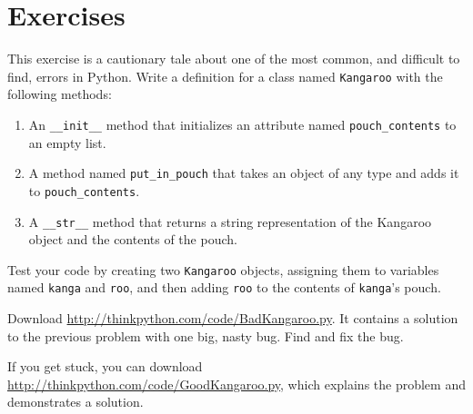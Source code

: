 \documentclass[10pt]{book}
\begin{document}
\section{Exercises}

\begin{exercise}

This exercise is a cautionary tale about one of the most
common, and difficult to find, errors in Python.
Write a definition for a class named {\tt Kangaroo} with the following
methods:

\begin{enumerate}

\item An \verb"__init__" method that initializes an attribute named 
\verb"pouch_contents" to an empty list.

\item A method named \verb"put_in_pouch" that takes an object
of any type and adds it to \verb"pouch_contents".

\item A \verb"__str__" method that returns a string representation
of the Kangaroo object and the contents of the pouch.

\end{enumerate}
%
Test your code 
by creating two {\tt Kangaroo} objects, assigning them to variables
named {\tt kanga} and {\tt roo}, and then adding {\tt roo} to the
contents of {\tt kanga}'s pouch.

Download \url{http://thinkpython.com/code/BadKangaroo.py}.  It contains
a solution to the previous problem with one big, nasty bug.
Find and fix the bug.

If you get stuck, you can download
\url{http://thinkpython.com/code/GoodKangaroo.py}, which explains the
problem and demonstrates a solution.

\end{exercise}
\end{document}
